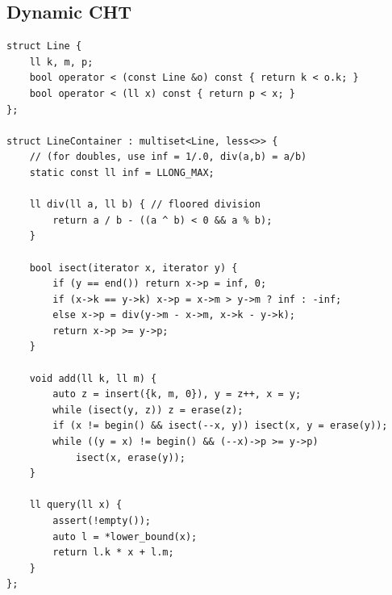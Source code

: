 \documentclass[10pt, portrait,letterpaper]{article}
\begin{document}
\subsection{Dynamic CHT}
\begin{verbatim}
struct Line {
    ll k, m, p;
    bool operator < (const Line &o) const { return k < o.k; }
    bool operator < (ll x) const { return p < x; }
};

struct LineContainer : multiset<Line, less<>> {
    // (for doubles, use inf = 1/.0, div(a,b) = a/b)
    static const ll inf = LLONG_MAX;
    
    ll div(ll a, ll b) { // floored division
        return a / b - ((a ^ b) < 0 && a % b);
    }
    
    bool isect(iterator x, iterator y) {
        if (y == end()) return x->p = inf, 0;
        if (x->k == y->k) x->p = x->m > y->m ? inf : -inf;
        else x->p = div(y->m - x->m, x->k - y->k);
        return x->p >= y->p;
    }

    void add(ll k, ll m) {
        auto z = insert({k, m, 0}), y = z++, x = y;
        while (isect(y, z)) z = erase(z);
        if (x != begin() && isect(--x, y)) isect(x, y = erase(y));
        while ((y = x) != begin() && (--x)->p >= y->p)
            isect(x, erase(y));
    }

    ll query(ll x) {
        assert(!empty());
        auto l = *lower_bound(x);
        return l.k * x + l.m;
    }
};

\end{verbatim}
\end{document}

